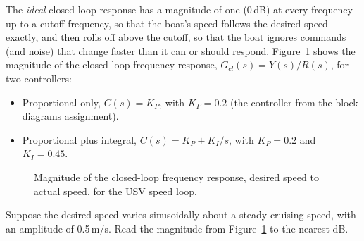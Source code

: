 \documentclass[11pt]{article}
\begin{document}
The \emph{ideal} closed-loop response has a magnitude of one (0\,dB) at every frequency up to a cutoff frequency, so that the boat's speed follows the desired speed exactly, and then rolls off above the cutoff, so that the boat ignores commands (and noise) that change faster than it can or should respond.  Figure~\ref{fig:bodemag} shows the magnitude of the closed-loop frequency response, $G_{cl}(s) = Y(s)/R(s)$, for two controllers:
\begin{itemize}
\item Proportional only, $C(s) = K_P$, with $K_P = 0.2$ (the controller from the block diagrams assignment).
\item Proportional plus integral, $C(s) = K_P + K_I/s$, with $K_P = 0.2$ and $K_I = 0.45$.
\end{itemize}

\begin{figure}[h!]
  \centering
  \caption{Magnitude of the closed-loop frequency response, desired speed to actual speed, for the USV speed loop.}
  \label{fig:bodemag}
\end{figure}

Suppose the desired speed varies sinusoidally about a steady cruising speed, with an amplitude of 0.5\,m/s.  Read the magnitude from Figure~\ref{fig:bodemag} to the nearest dB.
\end{document}
